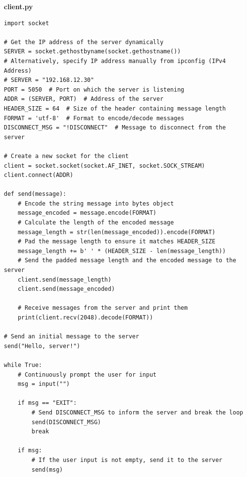 \newpage
\textbf{client.py}

\begin{codebox}
\begin{verbatim}
import socket

# Get the IP address of the server dynamically
SERVER = socket.gethostbyname(socket.gethostname())
# Alternatively, specify IP address manually from ipconfig (IPv4 Address)
# SERVER = "192.168.12.30"
PORT = 5050  # Port on which the server is listening
ADDR = (SERVER, PORT)  # Address of the server
HEADER_SIZE = 64  # Size of the header containing message length
FORMAT = 'utf-8'  # Format to encode/decode messages
DISCONNECT_MSG = "!DISCONNECT"  # Message to disconnect from the server

# Create a new socket for the client
client = socket.socket(socket.AF_INET, socket.SOCK_STREAM)
client.connect(ADDR)

def send(message):
    # Encode the string message into bytes object
    message_encoded = message.encode(FORMAT)
    # Calculate the length of the encoded message
    message_length = str(len(message_encoded)).encode(FORMAT)
    # Pad the message length to ensure it matches HEADER_SIZE
    message_length += b' ' * (HEADER_SIZE - len(message_length))
    # Send the padded message length and the encoded message to the server
    client.send(message_length)
    client.send(message_encoded)

    # Receive messages from the server and print them
    print(client.recv(2048).decode(FORMAT))

# Send an initial message to the server
send("Hello, server!")

while True:
    # Continuously prompt the user for input
    msg = input("")

    if msg == "EXIT":
        # Send DISCONNECT_MSG to inform the server and break the loop
        send(DISCONNECT_MSG)
        break

    if msg:
        # If the user input is not empty, send it to the server
        send(msg)
\end{verbatim}
\end{codebox}

\newpage
